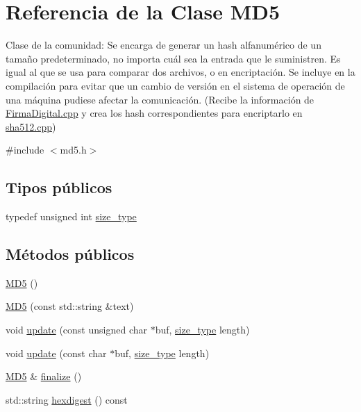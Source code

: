 \hypertarget{classMD5}{}\section{Referencia de la Clase M\+D5}
\label{classMD5}


Clase de la comunidad\+: Se encarga de generar un hash alfanumérico de un tamaño predeterminado, no importa cuál sea la entrada que le suministren. Es igual al que se usa para comparar dos archivos, o en encriptación. Se incluye en la compilación para evitar que un cambio de versión en el sistema de operación de una máquina pudiese afectar la comunicación. (Recibe la información de \hyperlink{FirmaDigital_8cpp}{Firma\+Digital.\+cpp} y crea los hash correspondientes para encriptarlo en \hyperlink{sha512_8cpp}{sha512.\+cpp})  




{\ttfamily \#include $<$md5.\+h$>$}

\subsection*{Tipos públicos}
\begin{DoxyCompactItemize}
\item 
typedef unsigned int \hyperlink{classMD5_aa836972700679dbcff6ae8337f6db464}{size\+\_\+type}
\end{DoxyCompactItemize}
\subsection*{Métodos públicos}
\begin{DoxyCompactItemize}
\item 
\hyperlink{classMD5_afa6155ec36de415ab2dcf5e54b670d13}{M\+D5} ()
\item 
\hyperlink{classMD5_a155356ffd713345e69e6dcbd9f8da6ce}{M\+D5} (const std\+::string \&text)
\item 
void \hyperlink{classMD5_ac5ddf6cd8f940422396d321ea90ed045}{update} (const unsigned char $\ast$buf, \hyperlink{classMD5_aa836972700679dbcff6ae8337f6db464}{size\+\_\+type} length)
\item 
void \hyperlink{classMD5_ac5ccba375539b993958fb235f8ac849c}{update} (const char $\ast$buf, \hyperlink{classMD5_aa836972700679dbcff6ae8337f6db464}{size\+\_\+type} length)
\item 
\hyperlink{classMD5}{M\+D5} \& \hyperlink{classMD5_a10f607494a3f2e3e515fc4b99d1a06cc}{finalize} ()
\item 
std\+::string \hyperlink{classMD5_aaf466f683b4bd8b1b66544f48bf09608}{hexdigest} () const
\end{DoxyCompactItemize}

